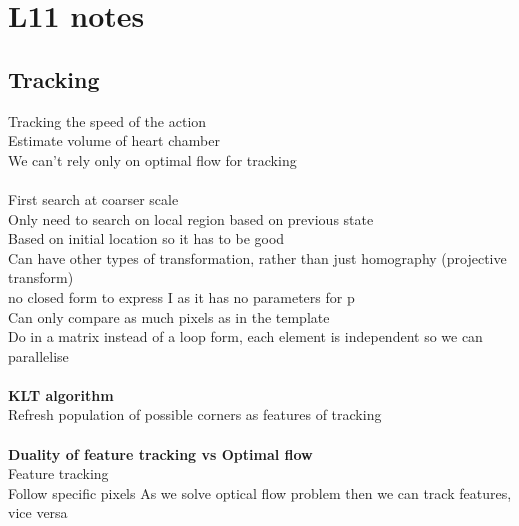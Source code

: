 \documentclass[11pt]{article}
\begin{document}
\section*{L11 notes}
\subsection*{Tracking}
Tracking the speed of the action\\
Estimate volume of heart chamber\\
We can't rely only on optimal flow for tracking\\
\\
First search at coarser scale\\
Only need to search on local region based on previous state
\\
Based on initial location so it has to be good
\\
Can have other types of transformation, rather than just homography (projective transform)
\\
no closed form to express I as it has no parameters for p	\\
Can only compare as much pixels as in the template
\\
Do in a matrix instead of a loop form, each element is independent so we can parallelise
\\\\
\textbf{KLT algorithm}\\
Refresh population of possible corners as features of tracking\\\\
\textbf{Duality of feature tracking vs Optimal flow}\\
Feature tracking\\
Follow specific pixels
As we solve optical flow problem then we can track features, vice versa\\
\end{document}
